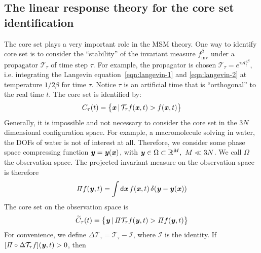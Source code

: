 \documentclass[aip,jcp,a4paper,reprint,onecolumn]{revtex4-1}
\newcommand{\vect}[1]{\textbf{\textit{#1}}}
\newcommand{\dd}{\textsf{d}}
\newcommand{\inv}{\textrm{inv}}
\newcommand{\mt}{\mathcal T}
\newcommand{\proj}{\mathit\Pi}
\newcommand{\fwg}{{\mathcal A}}
\begin{document}
\subsection{The linear response theory for the core set identification}

The core set plays a very important role in the MSM theory. One way to
identify core set is to consider the ``stability'' of the invariant
measure $f^\beta_{\inv}$ under a propagator $\mt_\tau$
of time step $\tau$.
For example, the propagator is chosen $\mt_\tau = e^{\tau\fwg_t^{2\beta}}$,
i.e. integrating the Langevin equation~\eqref{eqn:langevin-1}
and \eqref{eqn:langevin-2} at temperature $1/2\beta$ for time $\tau$.
Notice $\tau$ is an artificial time that is ``orthogonal'' to the real
time $t$.
The core set is identified by:
\begin{align}
  C_\tau(t) = \big\{
  \vect x \,\vert\, \mt_\tau f(\vect x, t) > f(\vect x, t)
  \big\}
\end{align}
Generally, it is impossible and not necessary to consider the core set
in the $3N$ dimensional configuration space. For example, a
macromolecule solving in water, the DOFs of water is not of interest
at all. Therefore, we consider some phase space compressing function
$\vect y = \vect y(\vect x)$, with $\vect y \in \Omega \subset \mathbb
R^M,\ M\ll 3N$. We call $\Omega$ the observation space.  The projected
invariant measure on the observation space is therefore
\begin{align}
  \proj f (\vect y, t)
  =
  \int
  \dd \vect x\,
  f(\vect x, t) \,
  \delta (\vect y - \vect y(\vect x)) 
\end{align}
The core set on the observation space is
\begin{align}
  \widetilde
  C_\tau(t) = \big\{
  \vect y \,\vert\,
  \proj\mt_\tau f(\vect y, t) > \proj f(\vect y, t)
  \big\}
\end{align}
For convenience, we define $\Delta \mt_\tau =
\mt_\tau - \mathcal I$, where $\mathcal I$ is the
identity. If $[\proj\circ\Delta \mt_\tau f](\vect y, t) > 0$, then
\end{document}
